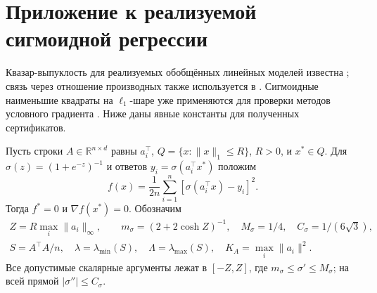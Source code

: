 \section{Приложение к реализуемой сигмоидной регрессии}
\label{reg:sigmoid}
Квазар-выпуклость для реализуемых обобщённых
линейных моделей известна \cite[лемма 3]{regglm}; связь через отношение
производных также используется в \cite[лемма 5]{regfoster}.
Сигмоидные наименьшие квадраты на $\ell_1$-шаре уже применяются
для проверки методов условного градиента \cite[раздел 5.1.4]{khademi}.
Ниже даны явные константы для полученных сертификатов.

Пусть строки $A\in\mathbb R^{n\times d}$ равны $a_i^\top$,
$Q=\{x:\|x\|_1\le R\}$, $R>0$, и $x^*\in Q$.
Для $\sigma(z)=(1+e^{-z})^{-1}$ и ответов
$y_i=\sigma(a_i^\top x^*)$ положим
\begin{equation}\label{reg:sigmoidloss}
 f(x)=\frac1{2n}\sum_{i=1}^n[\sigma(a_i^\top x)-y_i]^2.
\end{equation}
Тогда $f^*=0$ и $\nabla f(x^*)=0$. Обозначим
\[
 \begin{gathered}
 Z=R\max_i\|a_i\|_\infty,\qquad
 m_\sigma=(2+2\cosh Z)^{-1},\quad
 M_\sigma=1/4,\quad C_\sigma=1/(6\sqrt3),\\
 S=A^\top A/n,\quad \lambda=\lambda_{\min}(S),\quad
 \Lambda=\lambda_{\max}(S),\quad K_A=\max_i\|a_i\|^2.
 \end{gathered}
\]
Все допустимые скалярные аргументы лежат в $[-Z,Z]$, где
$m_\sigma\le\sigma'\le M_\sigma$; на всей прямой
$|\sigma''|\le C_\sigma$.


